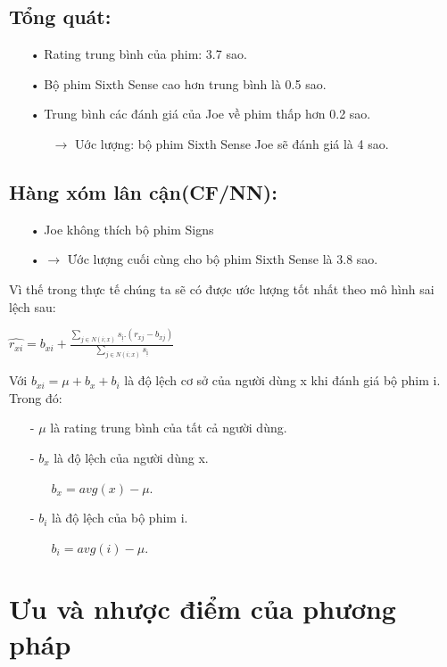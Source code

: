 \documentclass[a4paper,11pt]{report}
\begin{document}
\subsection{Tổng quát:}
\begin{itemize}
\item[•] Rating trung bình của phim: 3.7 sao.
\item[•] Bộ phim Sixth Sense cao hơn trung bình là 0.5 sao.
\item[•] Trung bình các đánh giá của Joe về phim thấp hơn 0.2 sao.
\begin{itemize}
\item[] $\rightarrow$ Uớc lượng: bộ phim Sixth Sense Joe sẽ đánh giá là 4 sao.
\end{itemize}
\end{itemize}
\subsection{Hàng xóm lân cận(CF/NN):}
\begin{itemize}
\item[•] Joe không thích bộ phim Signs
\item[•] $\rightarrow$ Ước lượng cuối cùng cho bộ phim Sixth Sense là 3.8 sao.
\end{itemize}
Vì thế trong thực tế chúng ta sẽ có được ước lượng tốt nhất theo mô hình sai lệch sau:
\newpage
\begin{center}
\huge{
$\hat{r_{xi}} = b_{xi} + \frac{\sum_{j\in N(i;x)}s_{ị}.(r_{xj} - b_{xj})}{\sum_{j\in N(i;x)}s_{ị} }$
}
\end{center}
Với $b_{xi} = \mu + b_x + b_i$ là độ lệch cơ sở của người dùng x khi đánh giá bộ phim i. Trong đó:
\begin{itemize}
\item[-] $\mu$ là rating trung bình của tất cả người dùng.
\item[-] $b_x$ là độ lệch của người dùng x.
\begin{itemize}
\item[] $b_x = avg(x) - \mu $.
\end{itemize}
\item[-] $b_i$ là độ lệch của bộ phim i.
\begin{itemize}
\item[] $b_i = avg(i) - \mu $.
\end{itemize}
\end{itemize}
\section{Ưu và nhược điểm của phương pháp}
\end{document}
